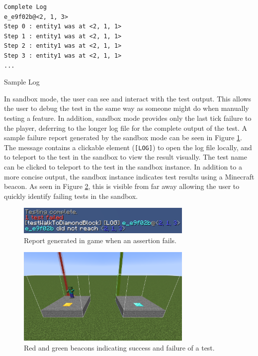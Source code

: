 \documentclass[12pt]{article}
\def\code#1{\texttt{#1}}
\begin{document}
\begin{onehalfspacing}
\begin{listing}[H]
\begin{verbatim}
Complete Log
e_e9f02b@<2, 1, 3>
Step 0 : entity1 was at <2, 1, 1>
Step 1 : entity1 was at <2, 1, 1>
Step 2 : entity1 was at <2, 1, 1>
Step 3 : entity1 was at <2, 1, 1>
...
\end{verbatim}
\caption{Sample Log}
\label{lst:4_3_4_1}
\end{listing}


In sandbox mode, the user can see and interact with the test output.
This allows the user to debug the test in the same way as someone might
do when manually testing a feature. In addition, sandbox mode provides
only the last tick failure to the player, deferring to the longer log
file for the complete output of the test. A sample failure report
generated by the sandbox mode can be seen in Figure \ref{fig:4_3_4_2}. The message
contains a clickable element (\code{{[}LOG{]}}) to open the log file locally,
and to teleport to the test in the sandbox to view the result visually.
The test name can be clicked to teleport to the test in the sandbox
instance. In addition to a more concise output, the sandbox instance
indicates test results using a Minecraft beacon. As seen in Figure
\ref{fig:4_3_4_3}, this is visible from far away allowing the user to quickly
identify failing tests in the sandbox.

\begin{figure}[H] 
    \centering
    \includegraphics[width=0.75\textwidth]{media/media/image6.png} 
    \caption{Report generated in game when an assertion fails.} 
    \label{fig:4_3_4_2}  
\end{figure}


\begin{figure}[H] 
    \centering
    \includegraphics[width=0.75\textwidth]{media/media/image3.png} 
    \caption{Red and green beacons indicating success and failure of a test.}
    \label{fig:4_3_4_3}  
\end{figure}


\end{onehalfspacing}
\end{document}
